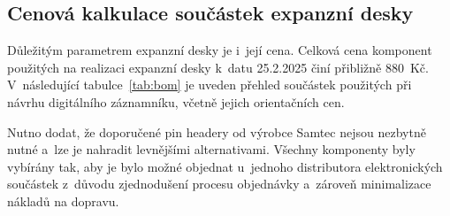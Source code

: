 \newpage


\subsection{Cenová kalkulace součástek expanzní desky}
\label{bom_list}

Důležitým parametrem expanzní desky je i~její cena. Celková cena komponent použitých na realizaci expanzní desky k~datu 25.2.2025 činí přibližně 880~Kč. V~následující tabulce~\ref{tab:bom} je uveden přehled součástek použitých při návrhu digitálního záznamníku, včetně jejich orientačních cen. 

Nutno dodat, že doporučené pin headery od výrobce Samtec nejsou nezbytně nutné a~lze je nahradit levnějšími alternativami. Všechny komponenty byly vybírány tak, aby je bylo možné objednat u~jednoho distributora elektronických součástek z~důvodu zjednodušení procesu objednávky a~zároveň minimalizace nákladů na dopravu.

